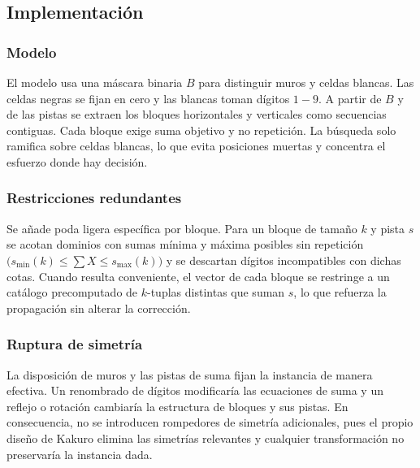 
\subsection{Implementación}\label{sec:02-kakuro-implementacion}

\subsubsection*{Modelo}
El modelo usa una máscara binaria \(B\) para distinguir muros y celdas blancas. Las celdas negras se fijan en cero y las blancas toman dígitos \(1\!-\!9\). A partir de \(B\) y de las pistas se extraen los bloques horizontales y verticales como secuencias contiguas. Cada bloque exige suma objetivo y no repetición. La búsqueda solo ramifica sobre celdas blancas, lo que evita posiciones muertas y concentra el esfuerzo donde hay decisión.

\subsubsection*{Restricciones redundantes}
Se añade poda ligera específica por bloque. Para un bloque de tamaño \(k\) y pista \(s\) se acotan dominios con sumas mínima y máxima posibles sin repetición \(\big(s_{\min}(k)\le \sum X \le s_{\max}(k)\big)\) y se descartan dígitos incompatibles con dichas cotas. Cuando resulta conveniente, el vector de cada bloque se restringe a un catálogo precomputado de \(k\)-tuplas distintas que suman \(s\), lo que refuerza la propagación sin alterar la corrección.

\subsubsection*{Ruptura de simetría}
La disposición de muros y las pistas de suma fijan la instancia de manera efectiva. Un renombrado de dígitos modificaría las ecuaciones de suma y un reflejo o rotación cambiaría la estructura de bloques y sus pistas. En consecuencia, no se introducen rompedores de simetría adicionales, pues el propio diseño de Kakuro elimina las simetrías relevantes y cualquier transformación no preservaría la instancia dada.
